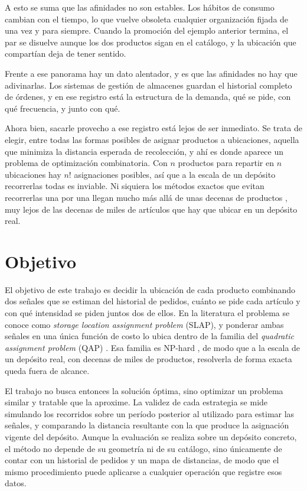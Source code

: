 A esto se suma que las afinidades no son estables.
Los hábitos de consumo cambian con el tiempo, lo que vuelve obsoleta cualquier organización fijada de una vez y para siempre.
Cuando la promoción del ejemplo anterior termina, el par se disuelve aunque los dos productos sigan en el catálogo, y la ubicación que compartían deja de tener sentido.

Frente a ese panorama hay un dato alentador, y es que las afinidades no hay que adivinarlas.
Los sistemas de gestión de almacenes guardan el historial completo de órdenes, y en ese registro está la estructura de la demanda, qué se pide, con qué frecuencia, y junto con qué.

Ahora bien, sacarle provecho a ese registro está lejos de ser inmediato.
Se trata de elegir, entre todas las formas posibles de asignar productos a ubicaciones, aquella que minimiza la distancia esperada de recolección, y ahí es donde aparece un problema de optimización combinatoria.
Con $n$ productos para repartir en $n$ ubicaciones hay $n!$ asignaciones posibles, así que a la escala de un depósito recorrerlas todas es inviable.
Ni siquiera los métodos exactos que evitan recorrerlas una por una llegan mucho más allá de unas decenas de productos \citep{loiola2007qap}, muy lejos de las decenas de miles de artículos que hay que ubicar en un depósito real.

\section{Objetivo}

El objetivo de este trabajo es decidir la ubicación de cada producto combinando dos señales que se estiman del historial de pedidos, cuánto se pide cada artículo y con qué intensidad se piden juntos dos de ellos.
En la literatura el problema se conoce como \emph{storage location assignment problem} (SLAP), y ponderar ambas señales en una única función de costo lo ubica dentro de la familia del \emph{quadratic assignment problem} (QAP) \citep{rojasreyes2019slap, koopmans1957assignment}.
Esa familia es NP-hard \citep{loiola2007qap}, de modo que a la escala de un depósito real, con decenas de miles de productos, resolverla de forma exacta queda fuera de alcance.

El trabajo no busca entonces la solución óptima, sino optimizar un problema similar y tratable que la aproxime.
La validez de cada estrategia se mide simulando los recorridos sobre un período posterior al utilizado para estimar las señales, y comparando la distancia resultante con la que produce la asignación vigente del depósito.
Aunque la evaluación se realiza sobre un depósito concreto, el método no depende de su geometría ni de su catálogo, sino únicamente de contar con un historial de pedidos y un mapa de distancias, de modo que el mismo procedimiento puede aplicarse a cualquier operación que registre esos datos.

